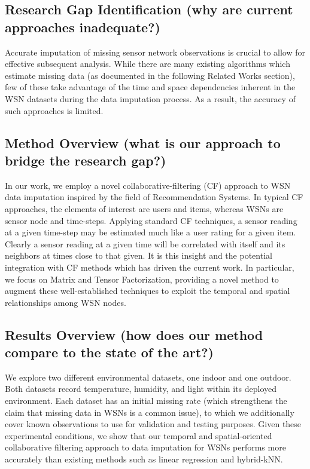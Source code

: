 \documentclass[10pt]{sensys11}
\begin{document}
\subsection{Research Gap Identification (why are current approaches inadequate?)}
Accurate imputation of missing sensor network observations is crucial to allow for effective subsequent analysis.
While there are many existing algorithms which estimate missing data (as documented in the following Related Works section), few of these take advantage of the time and space dependencies inherent in the WSN datasets during the data imputation process.
As a result, the accuracy of such approaches is limited.

\subsection{Method Overview (what is our approach to bridge the research gap?)}
In our work, we employ a novel collaborative-filtering (CF) approach to WSN data imputation inspired by the field of Recommendation Systems.
In typical CF approaches, the elements of interest are users and items, whereas WSNs are sensor node and time-steps.
Applying standard CF techniques, a sensor reading at a given time-step may be estimated much like a user rating for a given item.
Clearly a sensor reading at a given time will be correlated with itself and its neighbors at times close to that given.
It is this insight and the potential integration with CF methods which has driven the current work.
In particular, we focus on Matrix and Tensor Factorization, providing a novel method to augment these well-established techniques to exploit the temporal and spatial relationships among WSN nodes.

\subsection{Results Overview (how does our method compare to the state of the art?)}
We explore two different environmental datasets, one indoor and one outdoor.
Both datasets record temperature, humidity, and light within its deployed environment.
Each dataset has an initial missing rate (which strengthens the claim that missing data in WSNs is a common issue), to which we additionally cover known observations to use for validation and testing purposes.
Given these experimental conditions, we show that our temporal and spatial-oriented collaborative filtering approach to data imputation for WSNs performs more accurately than existing methods such as linear regression and hybrid-kNN.
\end{document}
